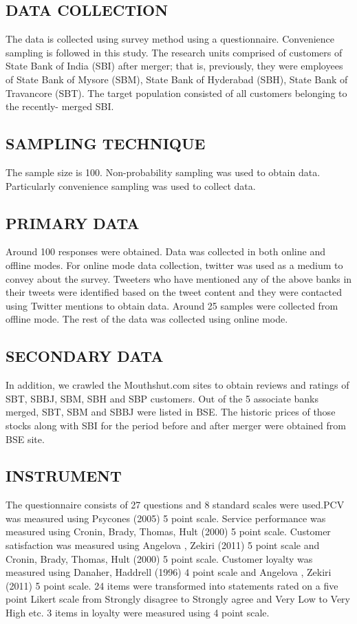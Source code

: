 \documentclass[a4paper, 12pt]{extarticle}
\begin{document}
{\subsection{DATA COLLECTION}
\par The data is collected using survey method using a questionnaire. Convenience sampling is followed in this study. The research units comprised of customers of State Bank of India (SBI) after merger; that is, previously, they were employees of State Bank of Mysore (SBM), State Bank of Hyderabad (SBH), State Bank of Travancore (SBT). The target population consisted of all customers belonging to the recently- merged SBI.
\subsection{SAMPLING TECHNIQUE}
The sample size is 100. Non-probability sampling was used to obtain data. Particularly convenience sampling was used to collect data.
\subsection{PRIMARY DATA}
\par Around 100 responses were obtained. Data was collected in both online and offline modes. For online mode data collection, twitter was used as a medium to convey about the survey. Tweeters who have mentioned any of the above banks in their tweets were identified based on the tweet content and they were contacted using Twitter mentions to obtain data. Around 25 samples were collected from offline mode. The rest of the data was collected using online mode.
\subsection{SECONDARY DATA}
In addition, we crawled the Mouthshut.com sites to obtain reviews and ratings of SBT, SBBJ, SBM, SBH and SBP customers. Out of the 5 associate banks merged, SBT, SBM and SBBJ were listed in BSE. The historic prices of those stocks along with SBI for the period before and after merger were obtained from BSE site.

\subsection{INSTRUMENT}
The questionnaire consists of 27 questions and 8 standard scales were used.PCV was measured using Psycones (2005)  5 point scale. Service performance was measured using Cronin, Brady, Thomas, Hult (2000)  5 point scale. Customer satisfaction was measured using 
Angelova , Zekiri (2011)  5 point scale and Cronin, Brady, Thomas, Hult (2000)  5 point scale. Customer loyalty was measured using Danaher, Haddrell (1996) 4 point scale and Angelova , Zekiri (2011) 5 point scale. 24 items were transformed into statements rated on a five  point Likert scale from Strongly disagree to Strongly agree and Very Low to Very High etc. 3 items in loyalty were measured using 4 point scale.

}
\end{document}
